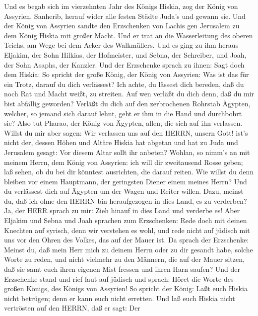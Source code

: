  Und es begab sich im vierzehnten Jahr des Königs Hiskia,
zog der König von Assyrien, Sanherib, herauf wider alle festen Städte
Juda's und gewann sie.  Und der König von Assyrien sandte
den Erzschenken von Lachis gen Jerusalem zu dem König Hiskia mit großer
Macht. Und er trat an die Wasserleitung des oberen Teichs, am Wege bei
dem Acker des Walkmüllers.  Und es ging zu ihm heraus
Eljakim, der Sohn Hilkias, der Hofmeister, und Sebna, der Schreiber, und
Joah, der Sohn Asaphs, der Kanzler.  Und der Erzschenke
sprach zu ihnen: Sagt doch dem Hiskia: So spricht der große König, der
König von Assyrien: Was ist das für ein Trotz, darauf du dich
verlässest?  Ich achte, du lässest dich bereden, daß du noch
Rat und Macht weißt, zu streiten. Auf wen verläßt du dich denn, daß du
mir bist abfällig geworden?  Verläßt du dich auf den
zerbrochenen Rohrstab Ägypten, welcher, so jemand sich darauf lehnt,
geht er ihm in die Hand und durchbohrt sie? Also tut Pharao, der König
von Ägypten, allen, die sich auf ihn verlassen.  Willst du
mir aber sagen: Wir verlassen uns auf den HERRN, unsern Gott! ist's
nicht der, dessen Höhen und Altäre Hiskia hat abgetan und hat zu Juda
und Jerusalem gesagt: Vor diesem Altar sollt ihr anbeten? 
Wohlan, so nimm's an mit meinem Herrn, dem König von Assyrien: ich will
dir zweitausend Rosse geben; laß sehen, ob du bei dir könntest
ausrichten, die darauf reiten.  Wie willst du denn bleiben
vor einem Hauptmann, der geringsten Diener einem meines Herrn? Und du
verlässest dich auf Ägypten um der Wagen und Reiter willen.
 Dazu, meinst du, daß ich ohne den HERRN bin heraufgezogen
in dies Land, es zu verderben? Ja, der HERR sprach zu mir: Zieh hinauf
in dies Land und verderbe es!  Aber Eljakim und Sebna und
Joah sprachen zum Erzschenken: Rede doch mit deinen Knechten auf
syrisch, denn wir verstehen es wohl, und rede nicht auf jüdisch mit uns
vor den Ohren des Volkes, das auf der Mauer ist.  Da sprach
der Erzschenke: Meinst du, daß mein Herr mich zu deinem Herrn oder zu
dir gesandt habe, solche Worte zu reden, und nicht vielmehr zu den
Männern, die auf der Mauer sitzen, daß sie samt euch ihren eigenen Mist
fressen und ihren Harn saufen?  Und der Erzschenke stand
und rief laut auf jüdisch und sprach: Höret die Worte des großen Königs,
des Königs von Assyrien!  So spricht der König: Laßt euch
Hiskia nicht betrügen; denn er kann euch nicht erretten. 
Und laß euch Hiskia nicht vertrösten auf den HERRN, daß er sagt: Der
